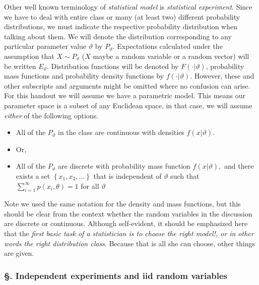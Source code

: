 \documentclass[ 11pt,%
				a4paper,%
				twoside,%
				headinclude,%
				footinclude = true,%
				cleardoublepage = empty,%
				reqno]{scrbook}
\begin{document}
 


Other well known terminology of \emph{statistical model} is \emph{statistical experiment}. Since we have to deal with entire class or many (at least two) different probability distributions, we must indicate the respective probability distribution when talking about them. We will denote the distribution corresponding to any particular parameter value $\vartheta$ by $P_{\vartheta}$. Expectations calculated under the assumption that $X \sim P_{\vartheta}$ ($X$ maybe a random variable or a random vector) will be written $E_{\vartheta}$. Distribution functions will be denoted by $F(\cdot| \vartheta)$, probability mass functions and probability density functions by $f(\cdot| \vartheta)$. However, these and other subscripts and arguments might be omitted where no confusion can arise. For this handout we will assume we have a parametric model. This means our parameter space is a subset of any Euclidean space, in that case, we will assume \emph{either} of the following options.

\begin{itemize}
  \item All of the $P_{\vartheta}$ in the class are continuous with densities $f(x| \vartheta)$.

  \item[] Or,

  \item All of the $P_{\vartheta}$ are discrete with probability mass function $f(x| \vartheta),$ and there exists a set $\left\{x_{1}, x_{2}, \ldots\right\}$ that is independent of $\vartheta$ such that $\sum_{i=1}^{\infty} p\left(x_{i}, \theta\right)=1$ for all $\vartheta$

\end{itemize}


Note we used the same notation for the density and mass functions, but this should be clear from the context whether the random variables in the discussion are discrete or continuous. Although self-evident, it should be emphasized here that the \emph{first basic task of a statistician is to choose the right model!, or in other words the right distribution class}. Because that is all she can choose, other things are given.


\subsubsection*{\S. Independent experiments and iid random variables}
\end{document}
